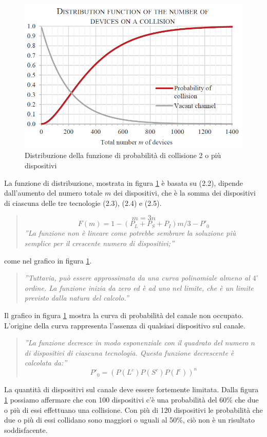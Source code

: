 \documentclass[a4paper]{report} %
\begin{document}
\begin{figure}
	\centering
	\includegraphics[scale=.5]{Immagini/DistribuzioneDiProb.png}
	
	\caption{Distribuzione della funzione di probabilità di collisione 2 o più dispositivi}
	\label{fig:dprob}
\end{figure}
La funzione di distribuzione, mostrata in figura \ref{fig:dprob} è basata su (2.2), dipende dall'aumento del numero totale $m$ dei dispositivi, che è la somma dei dispositivi di ciascuna delle tre tecnologie (2.3), (2.4) e (2.5).
\begin{quote}
	\begin{equation}
	m = 3n \label{m3n}
	\end{equation}
	\begin{equation}
	F(m) = 1 - (P_L+P_S+P_I)m/3 - P'_0 
	\end{equation}
	\textit{''La funzione non è lineare come potrebbe sembrare la soluzione più semplice per il crescente numero di dispositivi;''}
\end{quote}
come nel grafico in figura \ref{fig:dprob}. 
\begin{quote}
	\textit{''Tuttavia, può essere approssimata da una curva polinomiale almeno al $4^{\circ}$ ordine. La funzione inizia da zero ed è ad uno nel limite, che è un limite previsto dalla natura del calcolo.''} 
\end{quote}
Il grafico in figura \ref{fig:dprob} mostra la curva di probabilità del canale non occupato. L'origine della curva rappresenta l'assenza di qualsiasi dispositivo sul canale. 
\begin{quote}
	\textit{''La funzione decresce in modo esponenziale con il quadrato del numero $n$ di dispositivi di ciascuna tecnologia. Questa funzione decrescente è calcolata da:''}
	\begin{equation}
	P'_0 = (P(L^c)P(S^c)P(I^c))^n 
	\end{equation}
\end{quote}
La quantità di dispositivi sul canale deve essere fortemente limitata. Dalla figura \ref{fig:dprob} possiamo affermare che con 100 dispositivi c'è una probabilità del 60\% che due o più di essi effettuano una collisione. Con più di 120 dispositivi le probabilità che due o più di essi collidano sono maggiori o uguali al 50\%, ciò non è un risultato soddisfacente.
\end{document}
